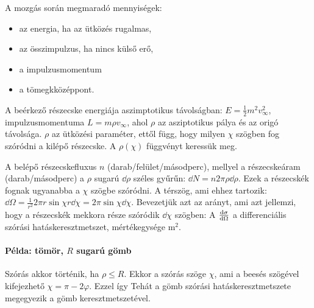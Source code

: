    A mozgás során megmaradó mennyiségek:
   \begin{itemize}
    \item az energia, ha az ütközés rugalmas,
    \item az összimpulzus, ha nincs külső erő,
    \item a impulzusmomentum
    \item a tömegkközéppont.
   \end{itemize}
   
   A beérkező részecske energiája aszimptotikus távolságban: $E=\frac{1}{2}m^2 v_\infty^2$, impulzusmomentuma $L=m\rho v_\infty$, ahol $\rho$ az asziptotikus pálya és az origó távolsága. $\rho$ az ütközési paraméter, ettől függ, hogy milyen $\chi$ szögben fog szóródni a kilépő részecske. A $\rho(\chi)$ függvényt keressük meg. 
   
   A belépő részecskefluxus $n$ (darab/felület/másodperc), mellyel a részecskeáram (da\-rab/má\-sod\-perc) a $\rho$ sugarú $\dd\rho$ széles gyűrűn: $\dd N=n2\pi\rho\dd\rho$. Ezek a részecskék fognak ugyanabba a $\chi$ szögbe szóródni. A térszög, ami ehhez tartozik: $\dd\Omega=\frac{1}{r^2}2\pi r\sin\chi r\dd\chi=2\pi\sin\chi\dd\chi$. Bevezetjük azt az arányt, ami azt jellemzi, hogy a részecskék mekkora része szóródik $\dd\chi$ szögben:
   A $\frac{\mathrm{d} \sigma}{\mathrm{d} \Omega}$ a differenciális szórási hatáskeresztmetszet, mértékegysége $\mathrm{m}^2$. 
   
   \paragraph{Példa: tömör, $R$ sugarú gömb}
    
    Szórás akkor történik, ha $\rho\leq R$. Ekkor a szórás szöge $\chi$, ami a beesés szögével kifejezhető $\chi=\pi-2\varphi$. 
    Ezzel
    így
    Tehát a gömb szórási hatáskeresztmetszete megegyezik a gömb keresztmetszetével.
    
